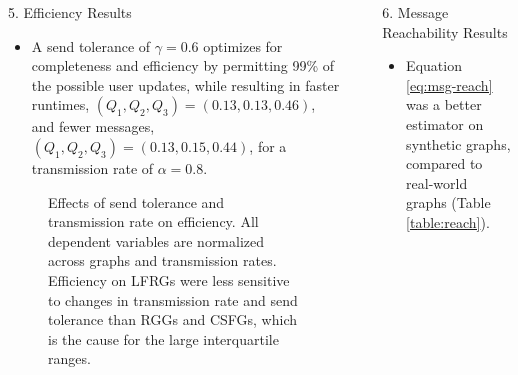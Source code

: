 \documentclass[final]{beamer}
\newlength{\sepwidth}
\newlength{\colwidth}
\newcommand{\separatorcolumn}{\begin{column}{\sepwidth}\end{column}}
\begin{document}
\begin{frame}[t]
\begin{columns}[t]
\begin{column}{\colwidth}
\begin{block}{5. Efficiency Results}
\begin{itemize}
			\item A send tolerance of $\gamma = 0.6$ optimizes for completeness and efficiency by permitting 99\% of the possible user updates, while resulting in faster runtimes, $(Q_1, Q_2, Q_3) = (0.13, 0.13, 0.46)$, and fewer messages, $(Q_1, Q_2, Q_3) = (0.13, 0.15, 0.44)$, for a transmission rate of $\alpha = 0.8$.
		\end{itemize}
		\begin{figure}
			\centering
			\caption{Effects of send tolerance and transmission rate on efficiency. All dependent variables are normalized across graphs and transmission rates. Efficiency on LFRGs were less sensitive to changes in transmission rate and send tolerance than RGGs and CSFGs, which is the cause for the large interquartile ranges.}
		\end{figure}
	\end{block}
\end{column}
\separatorcolumn
\begin{column}{\colwidth}
	\begin{block}{6. Message Reachability Results}
		\begin{itemize}
			\item Equation \eqref{eq:msg-reach} was a better estimator on synthetic graphs, compared to real-world graphs (Table \ref{table:reach}).

\end{itemize}
\end{block}
\end{column}
\end{columns}
\end{frame}
\end{document}
